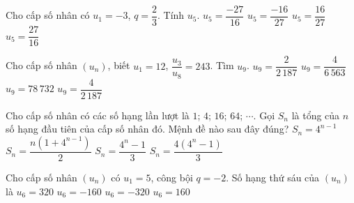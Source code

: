 

\begin{ex}%
	Cho cấp số nhân có $u_1=-3$, $q=\dfrac{2}{3}$.  Tính $u_5$.
	\choice 
		 {$u_5=\dfrac{-27}{16}$}
		{\True  $u_5=\dfrac{-16}{27}$}
		{$u_5=\dfrac{16}{27}$} 
		{$u_5=\dfrac{27}{16}$} 
\end{ex}

\begin{ex}%
	Cho cấp số nhân $(u_n)$,  biết $u_1=12$, $\dfrac{u_3}{u_8}=243$. Tìm $u_9$.
	\choice 
		{$u_9=\dfrac{2}{2\,187}$} 
		 {$u_9=\dfrac{4}{6\,563}$}
		{$u_9=78\,732$} 
		 {\True $u_9=\dfrac{4}{2\,187}$}
\end{ex}

\begin{ex}%
	Cho cấp số nhân có các số  hạng lần lượt là $1$; $4$; $16$; $64$; $\cdots$. Gọi $S_n$ là tổng của $n$ số hạng đầu tiên của cấp số nhân đó. Mệnh đề nào sau đây đúng?
	\choice 
		{$S_n=4^{n-1}$} 
		{$S_n=\dfrac{n\left(1+4^{n-1}\right)}{2}$} 
		{\True  $S_n=\dfrac{4^n-1}{3}$}
		{$S_n=\dfrac{4\left(4^n-1\right)}{3}$} 
\end{ex}

\begin{ex}%
	Cho cấp số nhân $(u_n)$ có $u_1=5$, công bội $q=-2$. Số  hạng thứ sáu của $(u_n)$ là
	\choice 
		 {$u_6=320$}
		 {\True $u_6=-160$}
		{$u_6=-320$} 
		{$u_6=160$} 
\end{ex}

